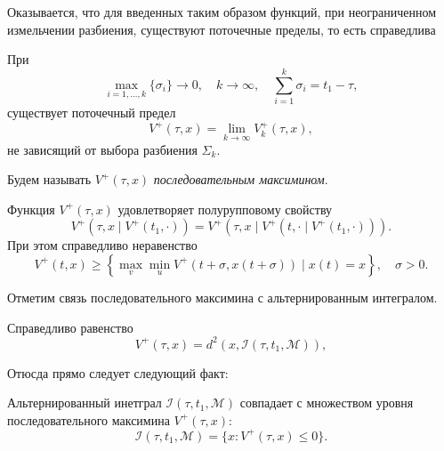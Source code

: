 Оказывается, что для введенных таким образом функций, при неограниченном измельчении разбиения,
 существуют поточечные пределы, то есть справедлива

\begin{lemma}
    При
    \begin{equation*}
        \max_{i = 1,\dots,k} \{\sigma_i\} \to 0, \quad k \to \infty, \quad \sum_{i = 1}^k \sigma_i = 
         t_1 - \tau, 
    \end{equation*}
    существует поточечный предел
    \begin{equation*}
        V^+(\tau, x) = \lim_{k \to \infty} V_k^+(\tau, x),
    \end{equation*}
    не зависящий от выбора разбиения \( \Sigma_k \).
\end{lemma}
Будем называть \( V^+(\tau, x) \) \emph{последовательным максимином}.
\begin{lemma}
    Функция \( V^+(\tau, x) \) удовлетворяет полурупповому свойству
    \[
        V^+(\tau, x \mid V^+(t_1, \cdot)) = V^+(\tau, x \mid V^+(t, \cdot \mid V^+(t_1, 
         \cdot))).  
    \]
    При этом справедливо неравенство
    \[
        V^+(t, x) \ge \left\{ \max_v \min_u V^+(t + \sigma, x(t + \sigma)) \mid x(t) = x 
         \right\}, \quad \sigma > 0.
    \]
\end{lemma}
Отметим связь последовательного максимина с альтернированным интегралом.
\begin{lemma}
    Справедливо равенство
    \[
        V^+ (\tau, x) = d^2(x, \mathcal{I}(\tau, t_1, \mathcal{M})),
    \]
\end{lemma}
Отюсда прямо следует следующий факт:
\begin{lemma}
    Альтернированный инетграл \( \mathcal{I}(\tau, t_1, \mathcal{M}) \) совпадает с
     множеством уровня последовательного максимина \( V^+(\tau, x) \):
    \[
        \mathcal{I}(\tau, t_1, \mathcal{M}) = \{ x : V^+(\tau, x) \le 0 \}.
    \]
\end{lemma}

